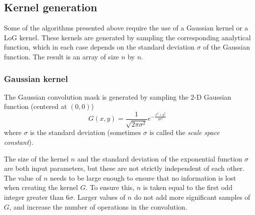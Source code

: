 \documentclass{ipol}
\numberwithin{equation}{section}
\numberwithin{table}{section}
\begin{document}

\subsection{Kernel generation}

Some of the algorithms presented above require the use of a Gaussian kernel or a LoG kernel. These 
kernels are generated by sampling the corresponding analytical function, which in each case depends 
on the standard deviation $\sigma$ of the Gaussian function. The result is an array of 
size $n$ by $n$.



\subsubsection{Gaussian kernel}

The Gaussian convolution mask is generated by sampling the 2-D Gaussian function (centered at $(0,0)$)
\begin{equation}
	\label{eq:gaussian_function}
	G(x,y) = \frac{1}{\sqrt{2\pi\sigma^2}}e^{-\frac{x^2+y^2}{2\sigma^2}}
\end{equation}
where $\sigma$ is the standard deviation (sometimes $\sigma$ is called the \textit{scale space constant}).

The size of the kernel $n$ and the standard deviation of the exponential function $\sigma$ are both 
input parameters, but these are not strictly independent of each other. 
The value of $n$ needs to be large enough to ensure that no information is lost when creating the kernel $G$. To ensure this, $n$ is taken equal to the first odd integer greater than $6\sigma$. Larger values of $n$ do not add more significant samples ​​of $G$, and increase the number of operations in the convolution.
\end{document}
